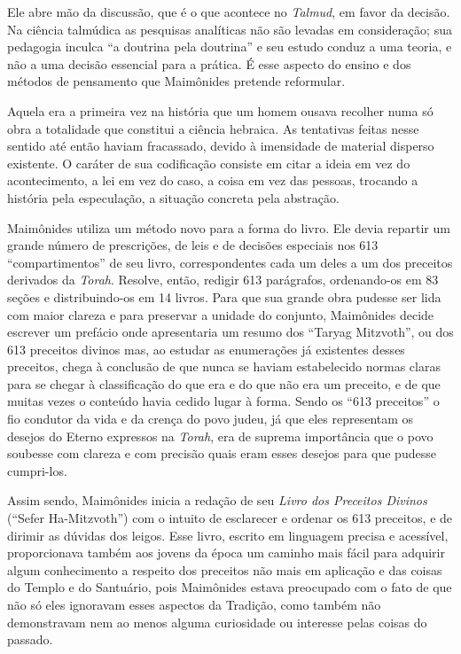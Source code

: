 Ele abre mão da discussão, que é o que acontece no \emph{Talmud}, em
favor da decisão. Na ciência talmúdica as pesquisas analíticas não são
levadas em consideração; sua pedagogia inculca ``a doutrina pela
doutrina'' e seu estudo conduz a uma teoria, e não a uma decisão
essencial para a prática. É esse aspecto do ensino e dos métodos de
pensamento que Maimônides pretende reformular.

Aquela era a primeira vez na história que um homem ousava recolher numa
só obra a totalidade que constitui a ciência hebraica. As tentativas
feitas nesse sentido até então haviam fracassado, devido à imensidade de
material disperso existente. O caráter de sua codificação consiste em
citar a ideia em vez do acontecimento, a lei em vez do caso, a coisa em
vez das pessoas, trocando a história pela especulação, a situação
concreta pela abstração.

Maimônides utiliza um método novo para a forma do livro. Ele devia
repartir um grande número de prescrições, de leis e de decisões
especiais nos 613 ``compartimentos'' de seu livro, correspondentes cada
um deles a um dos preceitos derivados da \emph{Torah}. Resolve, então,
redigir 613 parágrafos, ordenando-os em 83 seções e distribuindo-os em
14 livros. Para que sua grande obra pudesse ser lida com maior clareza e
para preservar a unidade do conjunto, Maimônides decide escrever um
prefácio onde apresentaria um resumo dos ``Taryag Mitzvoth'', ou dos
613 preceitos divinos mas, ao estudar as enumerações já existentes
desses preceitos, chega à conclusão de que nunca se haviam estabelecido
normas claras para se chegar à classificação do que era e do que não era
um preceito, e de que muitas vezes o conteúdo havia cedido lugar à
forma. Sendo os ``613 preceitos'' o fio condutor da vida e da crença do
povo judeu, já que eles representam os desejos do Eterno expressos na
\emph{Torah}, era de suprema importância que o povo soubesse com
clareza e com precisão quais eram esses desejos para que pudesse
cumpri-los.

Assim sendo, Maimônides inicia a redação de seu \emph{Livro dos
Preceitos Divinos} (``Sefer Ha-Mitzvoth'') com o intuito de esclarecer
e ordenar os 613 preceitos, e de dirimir as dúvidas dos leigos. Esse
livro, escrito em linguagem precisa e acessível, proporcionava também
aos jovens da época um caminho mais fácil para adquirir algum
conhecimento a respeito dos preceitos não mais em aplicação e das coisas
do Templo e do Santuário, pois Maimônides estava preocupado com o fato
de que não só eles ignoravam esses aspectos da Tradição, como também
não demonstravam nem ao menos alguma curiosidade ou interesse pelas
coisas do passado.

